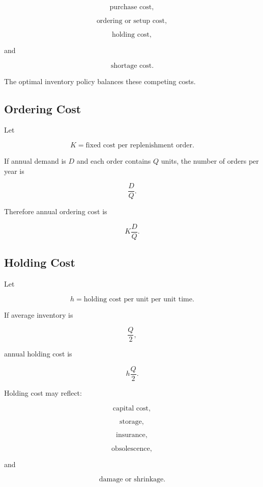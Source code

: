 \[
\boxed{
\text{purchase cost},
}
\]

\[
\boxed{
\text{ordering or setup cost},
}
\]

\[
\boxed{
\text{holding cost},
}
\]

and

\[
\boxed{
\text{shortage cost}.
}
\]

The optimal inventory policy balances these competing costs.

\subsection{Ordering Cost}
\label{subsec:ordering-cost}

Let

\[
\boxed{
K
=
\text{fixed cost per replenishment order}.
}
\]

If annual demand is \(D\) and each order contains \(Q\) units, the number
of orders per year is

\[
\boxed{
\frac{D}{Q}.
}
\]

Therefore annual ordering cost is

\[
\boxed{
K\frac{D}{Q}.
}
\]

\subsection{Holding Cost}
\label{subsec:holding-cost}

Let

\[
\boxed{
h
=
\text{holding cost per unit per unit time}.
}
\]

If average inventory is

\[
\frac{Q}{2},
\]

annual holding cost is

\[
\boxed{
h\frac{Q}{2}.
}
\]

Holding cost may reflect:

\[
\boxed{
\text{capital cost},
}
\]

\[
\boxed{
\text{storage},
}
\]

\[
\boxed{
\text{insurance},
}
\]

\[
\boxed{
\text{obsolescence},
}
\]

and

\[
\boxed{
\text{damage or shrinkage}.
}
\]

